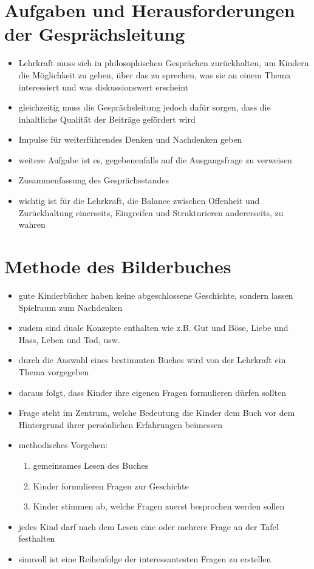 \section{Aufgaben und Herausforderungen der Gesprächsleitung}

\begin{itemize}

	\item{Lehrkraft muss sich in philosophischen Gesprächen zurückhalten, um Kindern die Möglichkeit zu geben, über das zu sprechen, was sie an einem Thema interessiert und was diskussionswert erscheint}
	\item{gleichzeitig muss die Gesprächsleitung jedoch dafür sorgen, dass die inhaltliche Qualität der Beiträge gefördert wird}
	\item{Impulse für weiterführendes Denken und Nachdenken geben}
	\item{weitere Aufgabe ist es, gegebenenfalls auf die Ausgangsfrage zu verweisen}
	\item{Zusammenfassung des Gesprächsstandes}
	\item{wichtig ist für die Lehrkraft, die Balance zwischen Offenheit und Zurückhaltung einerseits, Eingreifen und Strukturieren andererseits, zu wahren}

\end{itemize}

\section{Methode des Bilderbuches}

\begin{itemize}

	\item{gute Kinderbücher haben keine abgeschlossene Geschichte, sondern lassen Spielraum zum Nachdenken}
	\item{zudem sind duale Konzepte enthalten wie z.B. Gut und Böse, Liebe und Hass, Leben und Tod, usw.} 
	\item{durch die Auswahl eines bestimmten Buches wird von der Lehrkraft ein Thema vorgegeben}
	\item{daraus folgt, dass Kinder ihre eigenen Fragen formulieren dürfen sollten}
	\item{Frage steht im Zentrum, welche Bedeutung die Kinder dem Buch vor dem Hintergrund ihrer persönlichen Erfahrungen beimessen}
	\item{methodisches Vorgehen:
		\begin{enumerate}
		\item{gemeinsames Lesen des Buches}
		\item{Kinder formulieren Fragen zur Geschichte}
		\item{Kinder stimmen ab, welche Fragen zuerst besprochen werden sollen}
		\end{enumerate}
		}
	\item{jedes Kind darf nach dem Lesen eine oder mehrere Frage an der Tafel festhalten}
	\item{sinnvoll ist eine Reihenfolge der interessantesten Fragen zu erstellen}

\end{itemize}


